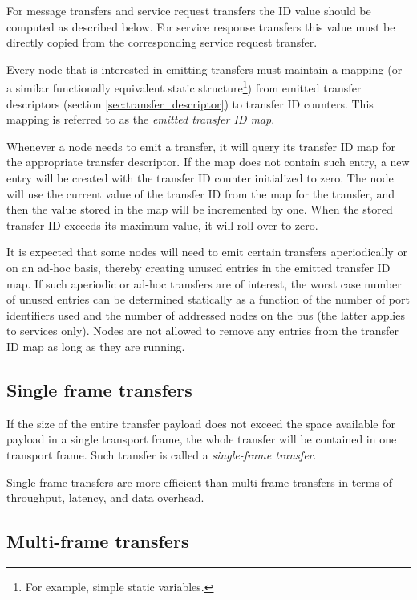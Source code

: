 For message transfers and service request transfers the ID value should be computed as described below.
For service response transfers this value must be directly copied from the corresponding service request transfer.

Every node that is interested in emitting transfers must maintain a mapping
(or a similar functionally equivalent static structure\footnote{For example, simple static variables.})
from emitted transfer descriptors (section \ref{sec:transfer_descriptor}) to transfer ID counters.
This mapping is referred to as the \emph{emitted transfer ID map}.

Whenever a node needs to emit a transfer, it will query its transfer ID map for the appropriate transfer descriptor.
If the map does not contain such entry, a new entry will be created with the transfer ID counter initialized to zero.
The node will use the current value of the transfer ID from the map for the transfer,
and then the value stored in the map will be incremented by one.
When the stored transfer ID exceeds its maximum value, it will roll over to zero.

It is expected that some nodes will need to emit certain transfers aperiodically or on an ad-hoc basis,
thereby creating unused entries in the emitted transfer ID map.
If such aperiodic or ad-hoc transfers are of interest,
the worst case number of unused entries can be determined statically as a function of the number of
port identifiers used and the number of addressed nodes on the bus (the latter applies to services only).
Nodes are not allowed to remove any entries from the transfer ID map as long as they are running.

\subsection{Single frame transfers}

If the size of the entire transfer payload does not exceed the space available for payload in a single transport frame,
the whole transfer will be contained in one transport frame.
Such transfer is called a \emph{single-frame transfer}.

Single frame transfers are more efficient than multi-frame transfers in terms of throughput, latency,
and data overhead.

\subsection{Multi-frame transfers}\label{sec:transport_multi_frame_transfers}

